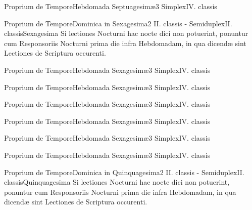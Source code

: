 \documentclass[liber-responsorialis_hiemalis.tex]{subfiles}
\begin{document}
	{Proprium de Tempore}{Hebdomada Septuagesimæ}{3}{}
	{Simplex}{IV. classis}{}
	{}
	{}

	{Proprium de Tempore}{Dominica in Sexagesima}{2}{}
	{II. classis - Semiduplex}{II. classis}{Sexagesima}
	{Si lectiones  Nocturni hac nocte dici non potuerint, ponuntur cum Responsoriis  Nocturni prima die infra Hebdomadam, in qua dicendæ sint Lectiones de Scriptura occurenti.}
	{}

	{Proprium de Tempore}{Hebdomada Sexagesimæ}{3}{}
	{Simplex}{IV. classis}{}
	{}
	{}

	{Proprium de Tempore}{Hebdomada Sexagesimæ}{3}{}
	{Simplex}{IV. classis}{}
	{}
	{}

	{Proprium de Tempore}{Hebdomada Sexagesimæ}{3}{}
	{Simplex}{IV. classis}{}
	{}
	{}

	{Proprium de Tempore}{Hebdomada Sexagesimæ}{3}{}
	{Simplex}{IV. classis}{}
	{}
	{}

	{Proprium de Tempore}{Hebdomada Sexagesimæ}{3}{}
	{Simplex}{IV. classis}{}
	{}
	{}

	{Proprium de Tempore}{Hebdomada Sexagesimæ}{3}{}
	{Simplex}{IV. classis}{}
	{}
	{}

	{Proprium de Tempore}{Dominica in Quinquagesima}{2}{}
	{II. classis - Semiduplex}{II. classis}{Quinquagesima}
	{Si lectiones  Nocturni hac nocte dici non potuerint, ponuntur cum Responsoriis  Nocturni prima die infra Hebdomadam, in qua dicendæ sint Lectiones de Scriptura occurenti.}
	{}
\end{document}

